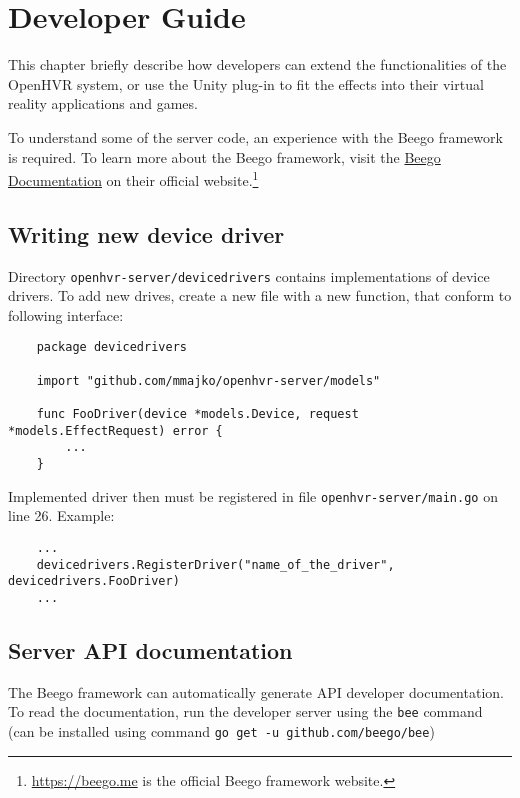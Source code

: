 \chapter{Developer Guide}\label{devguide}

This chapter briefly describe how developers can extend the functionalities
of the OpenHVR system, or use the Unity plug-in to fit the effects 
into their virtual reality applications and games.

To understand some of the server code, an experience with the Beego framework
is required. To learn more about the Beego framework, visit the
\href{https://beego.me/docs/intro/}{Beego Documentation} on their official
website.\footnote{\href{https://beego.me}{https://beego.me} is the official Beego framework website.}

\section*{Writing new device driver}

Directory \verb|openhvr-server/devicedrivers| contains implementations of
device drivers. To add new drives, create a new file with a new function,
that conform to following interface:

\begin{small}
\begin{verbatim}
    package devicedrivers

    import "github.com/mmajko/openhvr-server/models"

    func FooDriver(device *models.Device, request *models.EffectRequest) error {
        ...
    }
\end{verbatim}
\end{small}

Implemented driver then must be registered in file \verb|openhvr-server/main.go|
on line 26. Example:

\begin{small}
\begin{verbatim}
    ...
    devicedrivers.RegisterDriver("name_of_the_driver", devicedrivers.FooDriver)
    ...
\end{verbatim}
\end{small}

\section*{Server API documentation}

The Beego framework can automatically generate API developer documentation.
To read the documentation, run the developer server using the \verb|bee| command
(can be installed using command \verb|go get -u github.com/beego/bee|)

